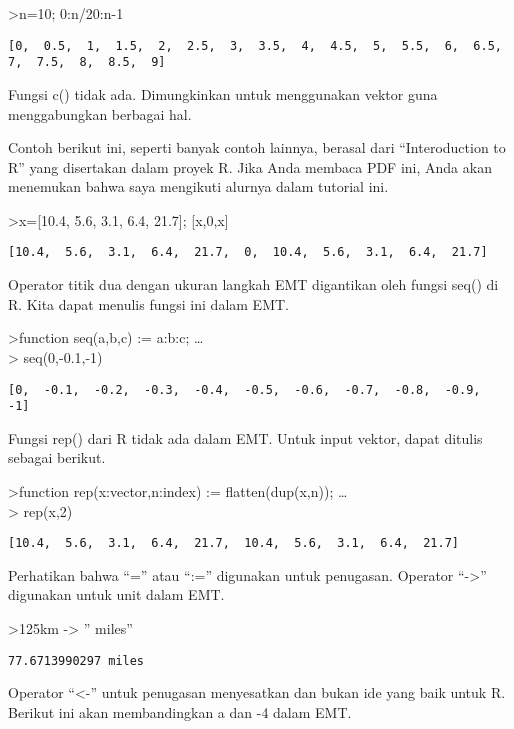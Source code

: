 \documentclass[
]{book}
\begin{document}
\textgreater n=10; 0:n/20:n-1

\begin{verbatim}
[0,  0.5,  1,  1.5,  2,  2.5,  3,  3.5,  4,  4.5,  5,  5.5,  6,  6.5,
7,  7.5,  8,  8.5,  9]
\end{verbatim}

Fungsi c() tidak ada. Dimungkinkan untuk menggunakan vektor guna menggabungkan berbagai hal.

Contoh berikut ini, seperti banyak contoh lainnya, berasal dari ``Interoduction to R'' yang disertakan dalam proyek R. Jika Anda membaca PDF ini, Anda akan menemukan bahwa saya mengikuti alurnya dalam tutorial ini.

\textgreater x={[}10.4, 5.6, 3.1, 6.4, 21.7{]}; {[}x,0,x{]}

\begin{verbatim}
[10.4,  5.6,  3.1,  6.4,  21.7,  0,  10.4,  5.6,  3.1,  6.4,  21.7]
\end{verbatim}

Operator titik dua dengan ukuran langkah EMT digantikan oleh fungsi seq() di R. Kita dapat menulis fungsi ini dalam EMT.

\textgreater function seq(a,b,c) := a:b:c; \ldots{}\\
\textgreater{} seq(0,-0.1,-1)

\begin{verbatim}
[0,  -0.1,  -0.2,  -0.3,  -0.4,  -0.5,  -0.6,  -0.7,  -0.8,  -0.9,  -1]
\end{verbatim}

Fungsi rep() dari R tidak ada dalam EMT. Untuk input vektor, dapat ditulis sebagai berikut.

\textgreater function rep(x:vector,n:index) := flatten(dup(x,n)); \ldots{}\\
\textgreater{} rep(x,2)

\begin{verbatim}
[10.4,  5.6,  3.1,  6.4,  21.7,  10.4,  5.6,  3.1,  6.4,  21.7]
\end{verbatim}

Perhatikan bahwa ``='' atau ``:='' digunakan untuk penugasan. Operator ``-\textgreater{}'' digunakan untuk unit dalam EMT.

\textgreater125km -\textgreater{} '' miles''

\begin{verbatim}
77.6713990297 miles
\end{verbatim}

Operator ``\textless-'' untuk penugasan menyesatkan dan bukan ide yang baik untuk R. Berikut ini akan membandingkan a dan -4 dalam EMT.
\end{document}

